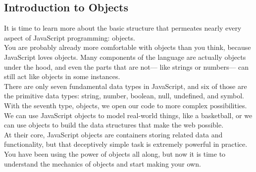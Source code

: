 \documentclass[11pt]{article}
\begin{document}
\subsection{Introduction to Objects}
It is time to learn more about the basic structure that permeates nearly every aspect of JavaScript programming: objects. \\
\newline
You are probably already more comfortable with objects than you think, because JavaScript loves objects. Many components of the language are actually objects under the hood, and even the parts that are not— like strings or numbers— can still act like objects in some instances. \\
\newline
There are only seven fundamental data types in JavaScript, and six of those are the primitive data types: string, number, boolean, null, undefined, and symbol. With the seventh type, objects, we open our code to more complex possibilities. We can use JavaScript objects to model real-world things, like a basketball, or we can use objects to build the data structures that make the web possible. \\
\newline
At their core, JavaScript objects are containers storing related data and functionality, but that deceptively simple task is extremely powerful in practice. You have been using the power of objects all along, but now it is time to understand the mechanics of objects and start making your own.
\end{document}
